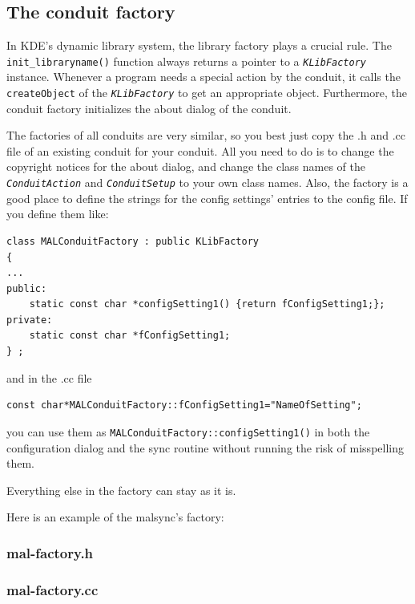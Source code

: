 \documentclass[10pt,a4paper]{article}
\newcommand{\code}[1]{{\small\texttt{#1}}}
\newcommand{\class}[1]{{\small\em\texttt{#1}}}
\begin{document}
\subsection{The conduit factory}

In KDE's dynamic library system, the library factory plays a crucial rule. The \code{init\_libraryname()} function 
always returns a pointer to a \class{KLibFactory} instance. Whenever a program needs a special action by 
the conduit, it calls the \code{createObject} of the \class{KLibFactory} to get an appropriate object.
Furthermore, the conduit factory initializes the about dialog of the conduit. 

The factories of all conduits are very similar, so you best just copy the .h and .cc file of an existing conduit 
for your conduit. All you need to do is to change the copyright notices for the about dialog, and 
change the class names of the \class{ConduitAction} and \class{ConduitSetup} to your own class names. Also, 
the factory is a good place to define the strings for the config settings' entries to the config file.
If you define them like:
{\footnotesize\begin{verbatim}
class MALConduitFactory : public KLibFactory
{
...
public:
    static const char *configSetting1() {return fConfigSetting1;};
private:
    static const char *fConfigSetting1;
} ;
\end{verbatim}
}
and in the .cc file
{\small\begin{verbatim}
const char*MALConduitFactory::fConfigSetting1="NameOfSetting";
\end{verbatim}
}
you can use them as \code{MALConduitFactory::configSetting1()} in 
both the configuration dialog and the sync routine without running the risk of misspelling
them.

Everything else in the factory can stay as it is.

Here is an example of the malsync's factory:
\begin{htmlonly}
\end{htmlonly}


\begin{latexonly}
\subsubsection{mal-factory.h}
{\scriptsize
 
}
\subsubsection{mal-factory.cc}
{\scriptsize
 
}
\end{latexonly}
\end{document}
